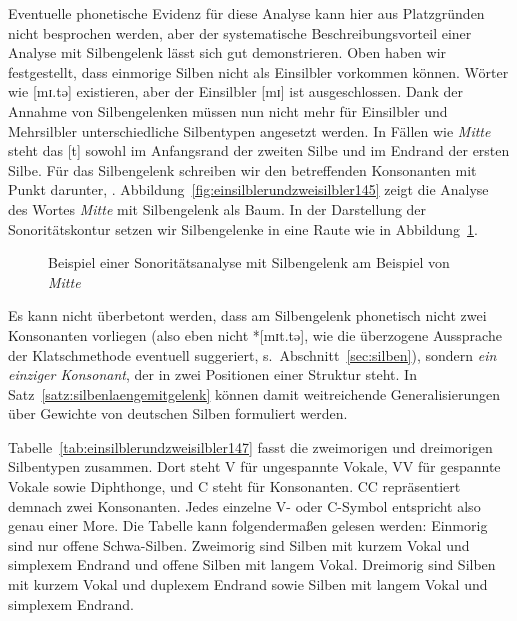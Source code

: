 Eventuelle phonetische Evidenz für diese Analyse kann hier aus Platzgründen nicht besprochen werden, aber der systematische Beschreibungsvorteil einer Analyse mit Silbengelenk lässt sich gut demonstrieren.
Oben haben wir festgestellt, dass einmorige Silben nicht als Einsilbler vorkommen können.
Wörter wie [mɪ.tə] existieren, aber der Einsilbler [mɪ] ist ausgeschlossen.
Dank der Annahme von Silbengelenken müssen nun nicht mehr für Einsilbler und Mehrsilbler unterschiedliche Silbentypen angesetzt werden.
In Fällen wie \textit{Mitte} steht das [t] sowohl im Anfangsrand der zweiten Silbe und im Endrand der ersten Silbe.
Für das Silbengelenk schreiben wir den betreffenden Konsonanten mit Punkt darunter, \zB [mɪṭə].
Abbildung~\ref{fig:einsilblerundzweisilbler145} zeigt die Analyse des Wortes \textit{Mitte} mit Silbengelenk als Baum.
In der Darstellung der Sonoritätskontur setzen wir Silbengelenke in eine Raute wie in Abbildung~\ref{fig:einsilblerundzweisilbler146}.

\begin{figure}[h]
  \centering
  \caption{Beispiel einer Sonoritätsanalyse mit Silbengelenk am Beispiel von \textit{Mitte}}
  \label{fig:einsilblerundzweisilbler146}
\end{figure}

Es kann nicht überbetont werden, dass am Silbengelenk phonetisch nicht zwei Konsonanten vorliegen (also eben nicht *[mɪt.tə], wie die überzogene Aussprache der Klatschmethode eventuell suggeriert, s.\ Abschnitt~\ref{sec:silben}), sondern \textit{ein einziger Konsonant}, der in zwei Positionen einer Struktur steht.
In Satz~\ref{satz:silbenlaengemitgelenk} können damit weitreichende Generalisierungen über Gewichte von deutschen Silben formuliert werden.


Tabelle~\ref{tab:einsilblerundzweisilbler147} fasst die zweimorigen und dreimorigen Silbentypen zusammen.
Dort steht V für ungespannte Vokale, VV für gespannte Vokale sowie Diphthonge, und C steht für Konsonanten.
CC repräsentiert demnach zwei Konsonanten.
Jedes einzelne V- oder C-Symbol entspricht also genau einer More.
Die Tabelle kann folgendermaßen gelesen werden:
Einmorig sind nur offene Schwa-Silben.
Zweimorig sind Silben mit kurzem Vokal und simplexem Endrand und offene Silben mit langem Vokal.
Dreimorig sind Silben mit kurzem Vokal und duplexem Endrand sowie Silben mit langem Vokal und simplexem Endrand.

